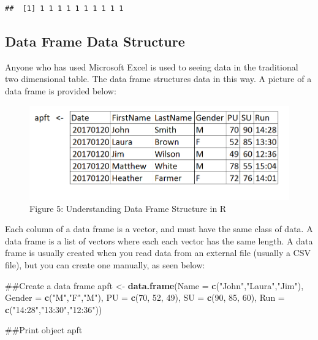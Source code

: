\documentclass[]{book}
\newenvironment{Shaded}{\begin{snugshade}}{\end{snugshade}}
\newcommand{\KeywordTok}[1]{\textcolor[rgb]{0.13,0.29,0.53}{\textbf{{#1}}}}
\newcommand{\DataTypeTok}[1]{\textcolor[rgb]{0.13,0.29,0.53}{{#1}}}
\newcommand{\DecValTok}[1]{\textcolor[rgb]{0.00,0.00,0.81}{{#1}}}
\newcommand{\StringTok}[1]{\textcolor[rgb]{0.31,0.60,0.02}{{#1}}}
\newcommand{\NormalTok}[1]{{#1}}
\begin{document}
\begin{verbatim}
##  [1] 1 1 1 1 1 1 1 1 1 1
\end{verbatim}

\subsection{Data Frame Data Structure}\label{data-frame-data-structure}

Anyone who has used Microsoft Excel is used to seeing data in the
traditional two dimensional table. The data frame structures data in
this way. A picture of a data frame is provided below:

\begin{figure}[htbp]
\centering
\includegraphics{dataframe.PNG}
\caption{Figure 5: Understanding Data Frame Structure in R}
\end{figure}

Each column of a data frame is a vector, and must have the same class of
data. A data frame is a list of vectors where each each vector has the
same length. A data frame is usually created when you read data from an
external file (usually a CSV file), but you can create one manually, as
seen below:

\begin{Shaded}
\begin{Highlighting}[]
\NormalTok{##Create a data frame}
\NormalTok{apft <-}\StringTok{ }\KeywordTok{data.frame}\NormalTok{(}\DataTypeTok{Name =} \KeywordTok{c}\NormalTok{(}\StringTok{"John"}\NormalTok{,}\StringTok{"Laura"}\NormalTok{,}\StringTok{"Jim"}\NormalTok{),}
                   \DataTypeTok{Gender =} \KeywordTok{c}\NormalTok{(}\StringTok{"M"}\NormalTok{,}\StringTok{"F"}\NormalTok{,}\StringTok{"M"}\NormalTok{),}
                   \DataTypeTok{PU =} \KeywordTok{c}\NormalTok{(}\DecValTok{70}\NormalTok{, }\DecValTok{52}\NormalTok{, }\DecValTok{49}\NormalTok{),}
                   \DataTypeTok{SU =} \KeywordTok{c}\NormalTok{(}\DecValTok{90}\NormalTok{, }\DecValTok{85}\NormalTok{, }\DecValTok{60}\NormalTok{),}
                   \DataTypeTok{Run =} \KeywordTok{c}\NormalTok{(}\StringTok{"14:28"}\NormalTok{,}\StringTok{"13:30"}\NormalTok{,}\StringTok{"12:36"}\NormalTok{))}

\NormalTok{##Print object}
\NormalTok{apft}
\end{Highlighting}
\end{Shaded}
\end{document}
